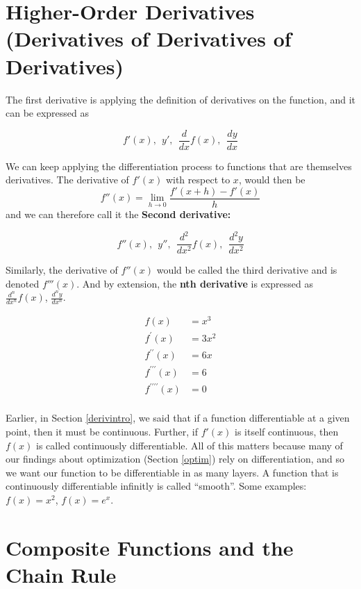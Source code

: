 \documentclass[]{book}
\theoremstyle{definition}
\theoremstyle{definition}
\theoremstyle{definition}
\theoremstyle{remark}
\let\BeginKnitrBlock\begin \let\EndKnitrBlock\end
\begin{document}
\hypertarget{derivpoly}{%
\section{Higher-Order Derivatives (Derivatives of Derivatives of Derivatives)}\label{derivpoly}}

The first derivative is applying the definition of derivatives on the function, and it can be expressed as

\[f'(x),  ~~ y',  ~~ \frac{d}{dx}f(x), ~~ \frac{dy}{dx}\]

We can keep applying the differentiation process to functions that are themselves derivatives. The derivative of \(f'(x)\) with respect to \(x\), would then be \[f''(x)=\lim\limits_{h\to 0}\frac{f'(x+h)-f'(x)}{h}\] and we can therefore call it the \textbf{Second derivative:}

\[f''(x), ~~ y'', ~~ \frac{d^2}{dx^2}f(x), ~~ \frac{d^2y}{dx^2}\]

Similarly, the derivative of \(f''(x)\) would be called the third derivative and is denoted \(f'''(x)\). And by extension, the \textbf{nth derivative} is expressed as \(\frac{d^n}{dx^n}f(x)\), \(\frac{d^ny}{dx^n}\).

\BeginKnitrBlock{example}[Succession of Derivatives]
\protect\hypertarget{exm:unnamed-chunk-16}{}{\label{exm:unnamed-chunk-16} {} }\begin{align*}
f(x) &=x^3\\
f^{\prime}(x) &=3x^2\\
f^{\prime\prime}(x) &=6x \\
f^{\prime\prime\prime}(x) &=6\\
f^{\prime\prime\prime\prime}(x) &=0\\
\end{align*}
\EndKnitrBlock{example}

Earlier, in Section \ref{derivintro}, we said that if a function differentiable at a given point, then it must be continuous. Further, if \(f'(x)\) is itself continuous, then \(f(x)\) is called continuously differentiable. All of this matters because many of our findings about optimization (Section \ref{optim}) rely on differentiation, and so we want our function to be differentiable in as many layers. A function that is continuously differentiable infinitly is called ``smooth''. Some examples: \(f(x) = x^2\), \(f(x) = e^x\).

\hypertarget{composite-functions-and-the-chain-rule}{%
\section{Composite Functions and the Chain Rule}\label{composite-functions-and-the-chain-rule}}
\end{document}
